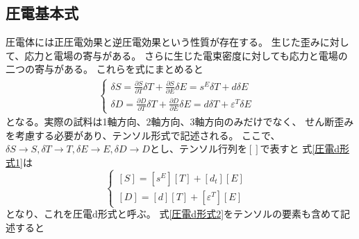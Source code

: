 \documentclass[dvipdfmx,12pt,a4paper]{jreport}
\begin{document}
		\subsection{圧電基本式}
		圧電体には正圧電効果と逆圧電効果という性質が存在する。
		生じた歪みに対して、応力と電場の寄与がある。
		さらに生じた電束密度に対しても応力と電場の二つの寄与がある。
		これらを式にまとめると
				\begin{eqnarray}
					\begin{cases}
						\delta S=\frac{\partial S}{\partial T}\delta T + \frac{\partial S}{\partial E} \delta E 
						= s^{E}\delta T+d \delta E & \\
						\delta D=\frac{\partial D}{\partial T}\delta T + \frac{\partial D}{\partial E}\delta E 
						= d \delta T+\varepsilon^T \delta E  &
					\end{cases}
					\label{圧電d形式1}
				\end{eqnarray}
			となる。実際の試料は1軸方向、2軸方向、3軸方向のみだけでなく、
			せん断歪みを考慮する必要があり、テンソル形式で記述される。
			ここで、$\delta S\rightarrow S, \delta T\rightarrow T,
			\delta E\rightarrow E, \delta D\rightarrow D$とし、テンソル行列を$\left[　\right]$で表すと
			式\ref{圧電d形式1}は
			\begin{equation}
				\begin{cases}
					\left[S\right]=\left[s^E\right]\left[T\right]+\left[d_t\right]\left[E\right]& \\
					\left[D\right]=\left[d\right]\left[T\right]+\left[\varepsilon^T\right]\left[E\right]
				\end{cases}
				\label{圧電d形式2}
			\end{equation}
			となり、これを圧電d形式と呼ぶ。
			式\ref{圧電d形式2}をテンソルの要素も含めて記述すると
\end{document}
